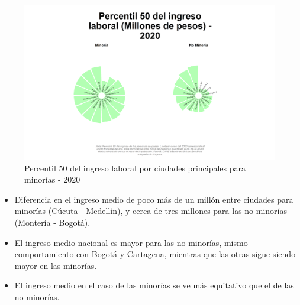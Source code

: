     \begin{figure}[H]
        \caption{Percentil 50 del ingreso laboral por ciudades principales para minorías - 2020 \label{map_result_2} }
        \begin{center}
        \includegraphics[width=\textwidth,keepaspectratio]{img/var_14_static.png}
        \end{center}
    \end{figure}
            \begin{itemize}
                    \item Diferencia en el ingreso medio de poco más de un millón entre ciudades para minorías (Cúcuta - Medellín), y cerca de tres millones para las no minorías (Montería - Bogotá).
                    \item El ingreso medio nacional es mayor para las no minorías, mismo comportamiento con  Bogotá y Cartagena, mientras que las otras sigue siendo mayor en las minorías.
                    \item El ingreso medio en el caso de las minorías se ve más equitativo que el de las no minorías.
                \end{itemize}

